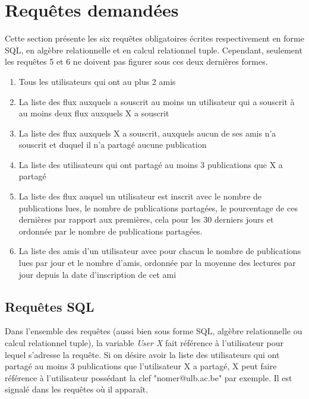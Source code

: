 \documentclass[a4paper,10pt]{article}
\begin{document}
\section{Requêtes demandées}

Cette section présente les six requêtes obligatoires écrites respectivement en forme SQL, en algèbre relationnelle et en calcul relationnel tuple. Cependant, seulement les requêtes 5 et 6 ne doivent pas figurer sous ces deux dernières formes.

	\begin{enumerate}
	    \item Tous les utilisateurs qui ont au plus 2 amis
	    \item La liste des flux auxquels a souscrit au moins un utilisateur qui a souscrit à au moins deux flux auxquels X a souscrit
	    \item La liste des flux auxquels X a souscrit, auxquels aucun de ses amis n’a souscrit et duquel il n’a partagé aucune publication
	    \item La liste des utilisateurs qui ont partagé au moins 3 publications que X a partagé
	    \item La liste des flux auquel un utilisateur est inscrit avec le nombre de publications lues, le nombre de publications partagées, le pourcentage de ces dernières par rapport aux premières, cela pour les 30 derniers jours et ordonnée par le nombre de publications partagées.
	    \item La liste des amis d’un utilisateur avec pour chacun le nombre de publications lues par jour et le nombre d’amis, ordonnée par la moyenne des lectures par jour depuis la date d’inscription de cet ami
	\end{enumerate}
	
\subsection{Requêtes SQL}

Dans l'ensemble des requêtes (aussi bien sous forme SQL, algèbre relationnelle ou calcul relationnel tuple), la variable \textsl{User X} fait référence à l'utilisateur pour lequel s'adresse la requête. Si on désire avoir la liste des utilisateurs qui ont partagé au moins 3 publications que l'utilisateur X a partagé, X peut faire référence à l'utilisateur possédant la clef "nomer@ulb.ac.be" par exemple. Il est signalé dans les requêtes où il apparaît.
\end{document}
